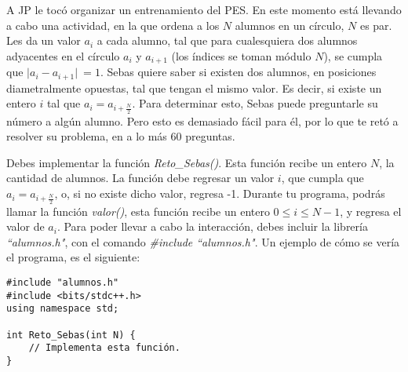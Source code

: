 \documentclass[12pt]{scrartcl}
\begin{document}
    

        A JP le tocó organizar un entrenamiento del PES. En este momento está llevando a cabo una actividad, en la que ordena a los $N$ alumnos en un círculo, $N$ es par. Les da un valor $a_i$ a cada alumno, tal que para cualesquiera dos alumnos adyacentes en el círculo $a_i$ y $a_{i + 1}$ (los índices se toman módulo $N$), se cumpla que $\lvert a_i - a_{i + 1} \lvert \ = 1$. Sebas quiere saber si existen dos alumnos, en posiciones diametralmente opuestas, tal que tengan el mismo valor. Es decir, si existe un entero $i$ tal que $a_{i} = a_{i + \frac{N}{2}}$. Para determinar esto, Sebas puede preguntarle su número a algún alumno. Pero esto es demasiado fácil para él, por lo que te retó a resolver su problema, en a lo más 60 preguntas.
    

       Debes implementar la función {\itshape Reto\_Sebas()}. Esta función recibe un entero $N$, la cantidad de alumnos. La función debe regresar un valor $i$, que cumpla que $a_i = a_{i + \frac{N}{2}}$, o, si no existe dicho valor, regresa -1. Durante tu programa, podrás llamar la función {\itshape valor()}, esta función recibe un entero $0 \le i \le N - 1$, y regresa el valor de $a_i$.  Para poder llevar a cabo la interacción, debes incluir la librería \textit{``alumnos.h"}, con el comando \textit{\#include ``alumnos.h"}.
       Un ejemplo de cómo se vería el programa, es el siguiente:
    

\begin{verbatim}
#include "alumnos.h"
#include <bits/stdc++.h>
using namespace std;

int Reto_Sebas(int N) {
    // Implementa esta función.
}
\end{verbatim}

    
\end{document}
